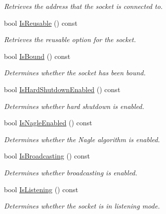 \begin{DoxyCompactItemize}
\begin{DoxyCompactList}\small\item\em Retrieves the address that the socket is connected to. \item\end{DoxyCompactList}\item 
bool \hyperlink{class_net_socket_simple_a473a943c476150a8f00680f65d556bdf}{IsReusable} () const 
\begin{DoxyCompactList}\small\item\em Retrieves the reusable option for the socket. \item\end{DoxyCompactList}\item 
bool \hyperlink{class_net_socket_simple_aeb463205e72dbde3d96cd1e461fec94e}{IsBound} () const 
\begin{DoxyCompactList}\small\item\em Determines whether the socket has been bound. \item\end{DoxyCompactList}\item 
bool \hyperlink{class_net_socket_simple_af90d97cee783650700cb75748ea988e4}{IsHardShutdownEnabled} () const 
\begin{DoxyCompactList}\small\item\em Determines whether hard shutdown is enabled. \item\end{DoxyCompactList}\item 
\hypertarget{class_net_socket_simple_a12614a447ec9d5421d10cc665d5cc494}{
bool \hyperlink{class_net_socket_simple_a12614a447ec9d5421d10cc665d5cc494}{IsNagleEnabled} () const }
\label{class_net_socket_simple_a12614a447ec9d5421d10cc665d5cc494}

\begin{DoxyCompactList}\small\item\em Determines whether the Nagle algorithm is enabled. \item\end{DoxyCompactList}\item 
bool \hyperlink{class_net_socket_simple_a1f70c51366efb20e63f628fdb1e5a2a2}{IsBroadcasting} () const 
\begin{DoxyCompactList}\small\item\em Determines whether broadcasting is enabled. \item\end{DoxyCompactList}\item 
bool \hyperlink{class_net_socket_simple_a180e2c21304ca37bc1e1e92fb84f3fcc}{IsListening} () const 
\begin{DoxyCompactList}\small\item\em Determines whether the socket is in listening mode. \item\end{DoxyCompactList}\end{DoxyCompactItemize}
